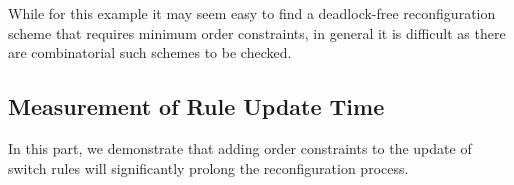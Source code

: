 While for this example it may seem easy to find a deadlock-free reconfiguration scheme that requires minimum order constraints, in general it is difficult as there are combinatorial such schemes to be checked.


\subsection{Measurement of Rule Update Time}\label{subsec:updatetime}

In this part, we demonstrate that adding order constraints to the update of switch rules will significantly prolong the reconfiguration process.








%
%	
%	

%

